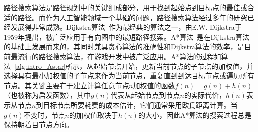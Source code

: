 
路径搜索算法是路径规划中的关键组成部分，用于找到起始点到目标点的最佳或合适的路径。而作为人工智能领域一个基础的问题，路径搜索算法经过多年的研究已经发展得非常成熟。Dijkstra算法~\cite{dijkstra1959note}作为最经典的算法之一，由E.W. Dijkstra于1959年提出，被广泛应用于有向图中的最短路径搜索。A*算法~\cite{hart1968formal}是在Dijkstra算法的基础上发展而来的，其同时兼具贪心算法的准确性和Dijkstra算法的效率，是目前最流行的路径搜索算法，在游戏开发中被广泛应用。A*算法的过程如算法~\ref{alg:intro_Astar}所示，从起始节点开始，更新当前节点的子节点的加权值，并选择具有最小加权值的子节点来作为当前节点，重复直到到达目标节点或遍历所有节点。其关键主要在于建立计算任意节点$n$加权值的函数$f(n)=g(n)+h(n)$（也被称为启发函数），其中$g(n)$代表从起始节点到节点$n$的实际代价，$h(n)$表示从节点$n$到目标节点所要耗费的成本估计，它们通常采用欧氏距离计算。当$g(n)$不变时，节点$n$的加权值取决于$h(n)$的大小，因此A*算法的搜索过程总是保持朝着目节点方向。


